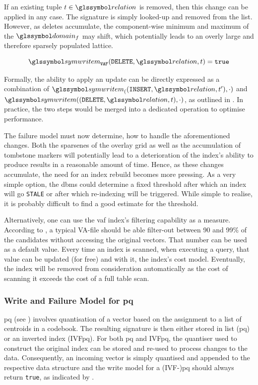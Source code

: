 If an existing tuple $t \in \relation$ is removed, then this change can be applied in any case. The signature is simply looked-up and removed from the list. However, as deletes accumulate, the component-wise minimum and maximum of the $\domain_f$ may shift, which potentially leads to an overly large and therefore sparsely populated lattice.

\begin{equation}
    \label{equation:write_model_delete_vaf}
    \symwritem_{\mathtt{VAF}}(\mathtt{DELETE}, \relation, t) = \mathtt{true}
\end{equation}

Formally, the ability to apply an update can be directly expressed as a combination of $ \symwritem_((\mathtt{INSERT}, \relation, t^{\prime}),\cdot)$ and $ \symwritem((\mathtt{DELETE}, \relation, t), \cdot)$, as outlined in . In practice, the two steps would be merged into a dedicated operation to optimise performance.

The failure model must now determine, how to handle the aforementioned changes. Both the sparsenes of the overlay grid as well as the accumulation of tombstone markers will potentially lead to a deterioration of the index's ability to produce results in a reasonable amount of time. Hence, as these changes accumulate, the need for an index rebuild becomes more pressing. As a very simple option, the \acrshort{dbms} could determine a fixed threshold after which an index will go \texttt{STALE} or after which re-indexing will be triggered. While simple to realise, it is probably difficult to find a good estimate for the threshold.

Alternatively, one can use the \acrshort{vaf} index's filtering capability as a measure. According to \cite{Weber:1998Va}, a typical VA-file should be able filter-out between 90 and 99\% of the candidates without accessing the original vectors. That number can be used as a default value. Every time an index is scanned, when executing a query, that value can be updated (for free) and with it, the index's cost model. Eventually, the index will be removed from consideration automatically as the cost of scanning it exceeds the cost of a full table scan. 

\subsubsection{Write and Failure Model for \texorpdfstring{\acrfull{pq}}{PQ}}
\acrshort{pq} (see  ) involves quantisation of a vector based on the assignment to a list of centroids in a codebook. The resulting signature is then either stored in list (\acrshort{pq}) or an inverted index (IVF\acrshort{pq}). For both \acrshort{pq} and IVF\acrshort{pq}, the quantiser used to construct the original index can be stored and re-used to process changes to the data. Consequently, an incoming vector is simply quantised and appended to the respective data structure and the write model for a (IVF-)\acrshort{pq} should always return \texttt{true}, as indicated by .

